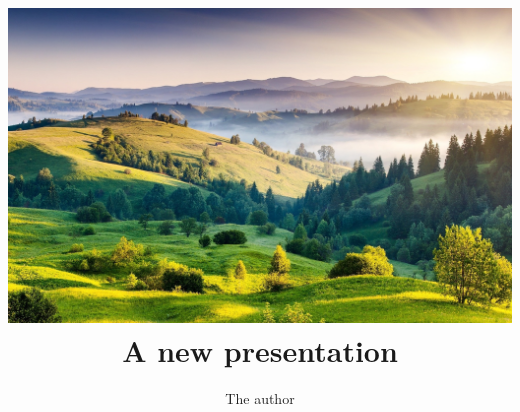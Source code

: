 \documentclass{beamer}
\title{
  \centering\includegraphics[width=\textwidth,height=.45\textheight]{nature1.jpg}\\
  A new presentation
}
\author{The author}
\institute{The Institute that pays him}
\begin{document}
\begin{frame}
  \titlepage
\end{frame}
\end{document}
